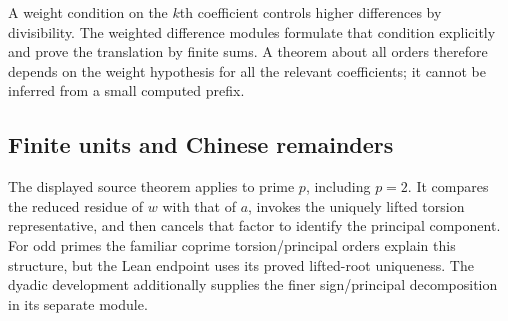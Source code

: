 A weight condition on the $k$th coefficient controls higher differences by divisibility. The weighted difference modules formulate that condition explicitly and prove the translation by finite sums. A theorem about all orders therefore depends on the weight hypothesis for all the relevant coefficients; it cannot be inferred from a small computed prefix.

\subsection{Finite units and Chinese remainders}
The displayed source theorem applies to prime $p$, including $p=2$. It compares the reduced residue of $w$ with that of $a$, invokes the uniquely lifted torsion representative, and then cancels that factor to identify the principal component. For odd primes the familiar coprime torsion/principal orders explain this structure, but the Lean endpoint uses its proved lifted-root uniqueness. The dyadic development additionally supplies the finer sign/principal decomposition in its separate module.

